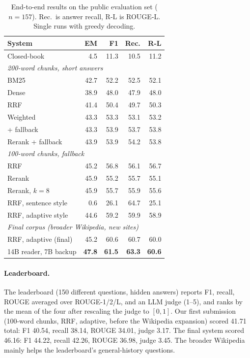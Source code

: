 \documentclass[11pt]{article}
\begin{document}
\begin{table}[t]
  \centering
  \small
  \setlength{\tabcolsep}{4pt}
  \begin{tabular}{lrrrr}
    \toprule
    System & EM & F1 & Rec. & R-L \\
    \midrule
    Closed-book & 4.5 & 11.3 & 10.5 & 11.2 \\
    \midrule
    \multicolumn{5}{l}{\emph{200-word chunks, short answers}} \\
    BM25 & 42.7 & 52.2 & 52.5 & 52.1 \\
    Dense & 38.9 & 48.0 & 47.9 & 48.0 \\
    RRF & 41.4 & 50.4 & 49.7 & 50.3 \\
    Weighted & 43.3 & 53.3 & 53.1 & 53.2 \\
    \quad + fallback & 43.3 & 53.9 & 53.7 & 53.8 \\
    Rerank + fallback & 43.9 & 53.9 & 54.2 & 53.8 \\
    \midrule
    \multicolumn{5}{l}{\emph{100-word chunks, fallback}} \\
    RRF & 45.2 & 56.8 & 56.1 & 56.7 \\
    Rerank & 45.9 & 55.2 & 55.7 & 55.1 \\
    Rerank, $k{=}8$ & 45.9 & 55.7 & 55.9 & 55.6 \\
    RRF, sentence style & 0.6 & 26.1 & 64.7 & 25.1 \\
    RRF, adaptive style & 44.6 & 59.2 & 59.9 & 58.9 \\
    \midrule
    \multicolumn{5}{l}{\emph{Final corpus (broader Wikipedia, new sites)}} \\
    RRF, adaptive (final) & 45.2 & 60.6 & 60.7 & 60.0 \\
    \quad 14B reader, 7B backup & \textbf{47.8} & \textbf{61.5} & \textbf{63.3} & \textbf{60.6} \\
    \bottomrule
  \end{tabular}
  \caption{End-to-end results on the public evaluation set ($n{=}157$). Rec.\ is answer recall, R-L is ROUGE-L. Single runs with greedy decoding.}
  \label{tab:results}
\end{table}

\paragraph{Leaderboard.} The leaderboard (150 different questions, hidden answers) reports F1, recall, ROUGE averaged over ROUGE-1/2/L, and an LLM judge (1--5), and ranks by the mean of the four after rescaling the judge to $[0,1]$. Our first submission (100-word chunks, RRF, adaptive, before the Wikipedia expansion) scored 41.71 total: F1 40.54, recall 38.14, ROUGE 34.01, judge 3.17. The final system scored 46.16: F1 44.22, recall 42.26, ROUGE 36.98, judge 3.45. The broader Wikipedia mainly helps the leaderboard's general-history questions.
\end{document}
